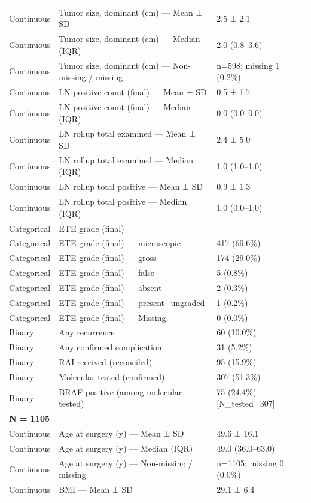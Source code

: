 \begin{table}[htbp]
\begin{tabular}{lll}
Continuous & Tumor size, dominant (cm) — Mean ± SD & 2.5 ± 2.1 \\
Continuous & Tumor size, dominant (cm) — Median (IQR) & 2.0 (0.8–3.6) \\
Continuous & Tumor size, dominant (cm) — Non-missing / missing & n=598; missing 1 (0.2\%) \\
Continuous & LN positive count (final) — Mean ± SD & 0.5 ± 1.7 \\
Continuous & LN positive count (final) — Median (IQR) & 0.0 (0.0–0.0) \\
Continuous & LN rollup total examined — Mean ± SD & 2.4 ± 5.0 \\
Continuous & LN rollup total examined — Median (IQR) & 1.0 (1.0–1.0) \\
Continuous & LN rollup total positive — Mean ± SD & 0.9 ± 1.3 \\
Continuous & LN rollup total positive — Median (IQR) & 1.0 (0.0–1.0) \\
Categorical & ETE grade (final) &  \\
Categorical & ETE grade (final) — microscopic & 417 (69.6\%) \\
Categorical & ETE grade (final) — gross & 174 (29.0\%) \\
Categorical & ETE grade (final) — false & 5 (0.8\%) \\
Categorical & ETE grade (final) — absent & 2 (0.3\%) \\
Categorical & ETE grade (final) — present\_ungraded & 1 (0.2\%) \\
Categorical & ETE grade (final) — Missing & 0 (0.0\%) \\
Binary & Any recurrence & 60 (10.0\%) \\
Binary & Any confirmed complication & 31 (5.2\%) \\
Binary & RAI received (reconciled) & 95 (15.9\%) \\
Binary & Molecular tested (confirmed) & 307 (51.3\%) \\
Binary & BRAF positive (among molecular-tested) & 75 (24.4\%) [N\_tested=307] \\
\multicolumn{3}{l}{\textbf{N = 1105}} \\
Continuous & Age at surgery (y) — Mean ± SD & 49.6 ± 16.1 \\
Continuous & Age at surgery (y) — Median (IQR) & 49.0 (36.0–63.0) \\
Continuous & Age at surgery (y) — Non-missing / missing & n=1105; missing 0 (0.0\%) \\
Continuous & BMI — Mean ± SD & 29.1 ± 6.4 \\

\end{tabular}
\end{table}
